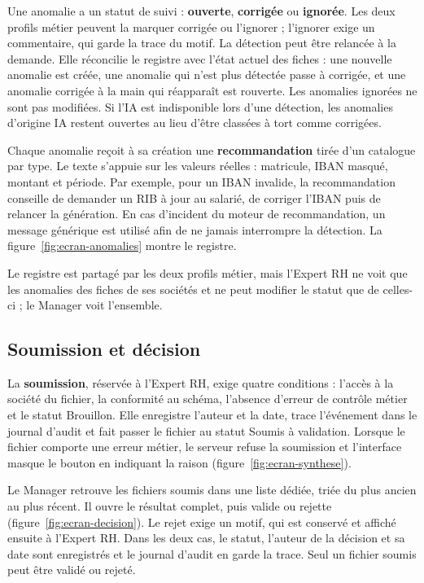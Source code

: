 Une anomalie a un statut de suivi : \textbf{ouverte}, \textbf{corrigée} ou \textbf{ignorée}. Les deux profils métier peuvent la marquer corrigée ou l'ignorer ; l'ignorer exige un commentaire, qui garde la trace du motif. La détection peut être relancée à la demande. Elle réconcilie le registre avec l'état actuel des fiches : une nouvelle anomalie est créée, une anomalie qui n'est plus détectée passe à \og corrigée\fg{}, et une anomalie corrigée à la main qui réapparaît est rouverte. Les anomalies ignorées ne sont pas modifiées. Si l'IA est indisponible lors d'une détection, les anomalies d'origine IA restent ouvertes au lieu d'être classées à tort comme corrigées.

Chaque anomalie reçoit à sa création une \textbf{recommandation} tirée d'un catalogue par type. Le texte s'appuie sur les valeurs réelles : matricule, IBAN masqué, montant et période. Par exemple, pour un IBAN invalide, la recommandation conseille de demander un RIB à jour au salarié, de corriger l'IBAN puis de relancer la génération. En cas d'incident du moteur de recommandation, un message générique est utilisé afin de ne jamais interrompre la détection. La figure~\ref{fig:ecran-anomalies} montre le registre.

Le registre est partagé par les deux profils métier, mais l'Expert RH ne voit que les anomalies des fiches de ses sociétés et ne peut modifier le statut que de celles-ci ; le Manager voit l'ensemble.

\subsection{Soumission et décision}

La \textbf{soumission}, réservée à l'Expert RH, exige quatre conditions : l'accès à la société du fichier, la conformité au schéma, l'absence d'erreur de contrôle métier et le statut \og Brouillon\fg{}. Elle enregistre l'auteur et la date, trace l'événement dans le journal d'audit et fait passer le fichier au statut \og Soumis à validation\fg{}. Lorsque le fichier comporte une erreur métier, le serveur refuse la soumission et l'interface masque le bouton en indiquant la raison (figure~\ref{fig:ecran-synthese}).

Le Manager retrouve les fichiers soumis dans une liste dédiée, triée du plus ancien au plus récent. Il ouvre le résultat complet, puis valide ou rejette (figure~\ref{fig:ecran-decision}). Le rejet exige un motif, qui est conservé et affiché ensuite à l'Expert RH. Dans les deux cas, le statut, l'auteur de la décision et sa date sont enregistrés et le journal d'audit en garde la trace. Seul un fichier soumis peut être validé ou rejeté.

